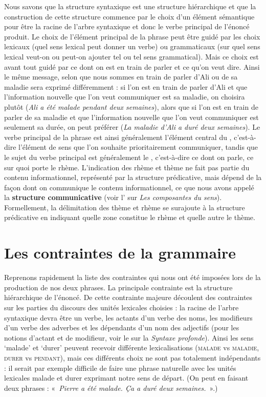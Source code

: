 Nous savons que la structure syntaxique est une structure hiérarchique et que la construction de cette structure commence par le choix d’un élément sémantique pour être la racine de l’arbre syntaxique et donc le verbe principal de l’énoncé produit. Le choix de l’élément principal de la phrase peut être guidé par les choix lexicaux (quel sens lexical peut donner un verbe) ou grammaticaux (sur quel sens lexical veut-on ou peut-on ajouter tel ou tel sens grammatical). Mais ce choix est avant tout guidé par ce dont on est en train de parler et ce qu’on veut dire. Ainsi le même message, selon que nous sommes en train de parler d’Ali ou de sa maladie sera exprimé différemment : si l’on est en train de parler d’Ali et que l’information nouvelle que l’on veut communiquer est sa maladie, on choisira plutôt  (\textit{Ali a été malade pendant deux semaines}), alors que si l’on est en train de parler de sa maladie et que l’information nouvelle que l’on veut communiquer est seulement sa durée, on peut préférer  (\textit{La maladie d’Ali a duré deux semaines}). Le verbe principal de la phrase est ainsi généralement l’élément central du , c’est-à-dire l’élément de sens que l’on souhaite prioritairement communiquer, tandis que le sujet du verbe principal est généralement le , c’est-à-dire ce dont on parle, ce sur quoi porte le rhème. L’indication des rhème et thème ne fait pas partie du contenu informationnel, représenté par la structure prédicative, mais dépend de la façon dont on communique le contenu informationnel, ce que nous avons appelé la \textbf{structure communicative} (voir l’ sur \textit{Les composantes du sens}). Formellement, la délimitation des thème et rhème se surajoute à la structure prédicative en indiquant quelle zone constitue le rhème et quelle autre le thème.

\section{Les contraintes de la grammaire}\label{sec:1.2.14}

Reprenons rapidement la liste des contraintes qui nous ont été imposées lors de la production de nos deux phrases. La principale contrainte est la structure hiérarchique de l’énoncé. De cette contrainte majeure découlent des contraintes sur les parties du discours des unités lexicales choisies : la racine de l’arbre syntaxique devra être un verbe, les actants d’un verbe des noms, les modifieurs d’un verbe des adverbes et les dépendants d’un nom des adjectifs (pour les notions d’actant et de modifieur, voir le  sur la \textit{Syntaxe profonde}). Ainsi les sens ‘malade’ et ‘durer’ peuvent recevoir différente lexicalisations (\textsc{malade} vs \textsc{maladie}, \textsc{durer} vs \textsc{pendant}), mais ces différents choix ne sont pas totalement indépendants : il serait par exemple difficile de faire une phrase naturelle avec les unités lexicales malade et durer exprimant notre sens de départ. (On peut en faisant deux phrases : «~\textit{Pierre a été malade. Ça a duré deux semaines.}~».)

